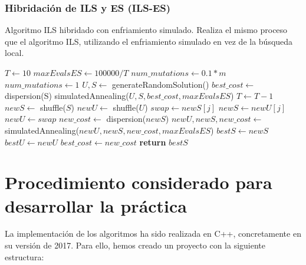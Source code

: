 \section{Hibridación de ILS y ES (ILS-ES)}
\begin{algorithm}[H]
    \caption{Algoritmo ILS hibridado con enfriamiento simulado. Realiza el mismo proceso que el algoritmo ILS, utilizando el enfriamiento simulado en vez de la búsqueda local.}
    \begin{algorithmic}[1]
        \State $T \leftarrow 10$
        \State $maxEvalsES \leftarrow 100000/T$
        \State $num\_mutations \leftarrow 0.1*m$
            \State $num\_mutations \leftarrow 1$
        \EndIf
        \State
        \State $U, S \leftarrow$ generateRandomSolution()
        \State
        \State $best\_cost \leftarrow$ dispersion(S)
        \State simulatedAnnealing($U, S, best\_cost, maxEvalsES$)
        \State $T \leftarrow T - 1$
        \State
            \State $newS \leftarrow$ shuffle($S$)
            \State $newU \leftarrow$ shuffle($U$)
            \State
                \State $swap \leftarrow newS[j]$
                \State $newS \leftarrow newU[j]$
                \State $newU \leftarrow swap$
            \EndFor
            \State 
            \State $new\_cost \leftarrow$ dispersion($newS$)
            \State $newU, newS, new\_cost \leftarrow$ simulatedAnnealing($newU, newS, new\_cost, maxEvalsES$)
            \State
                \State $bestS \leftarrow newS$
                \State $bestU \leftarrow newU$
                \State $best\_cost \leftarrow new\_cost$
            \EndIf
        \EndFor
        \State
        \State \textbf{return} $bestS$  
    \EndProcedure
    \end{algorithmic}
    \end{algorithm}

\part{Procedimiento considerado para desarrollar la práctica}

La implementación de los algoritmos ha sido realizada en C++, concretamente en su versión de 2017. Para ello, hemos creado un proyecto con la siguiente estructura:

